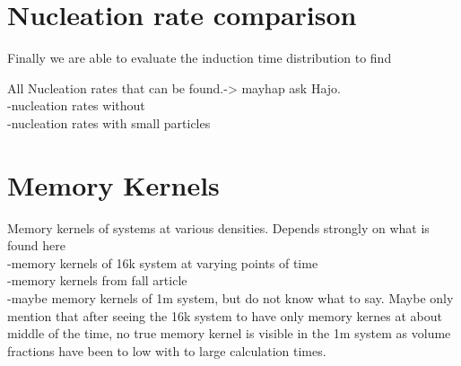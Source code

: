 \section{Nucleation rate comparison}
\label{sec:nucleation_rates}
Finally we are able to evaluate the induction time distribution to find 


All Nucleation rates that can be found.-> mayhap ask Hajo.\\
-nucleation rates without\\
-nucleation rates with small particles\\


\section{Memory Kernels}
\label{sec:memory_kernels}
Memory kernels of systems at various densities. Depends strongly on what is found here\\
-memory kernels of 16k system at varying points of time\\
-memory kernels from fall article\\
-maybe memory kernels of 1m system, but do not know what to say. Maybe only mention that after seeing the 16k system to have only memory kernes at about middle of the time, no true memory kernel is visible in the 1m system as volume fractions have been to low with to large calculation times.\\
 
